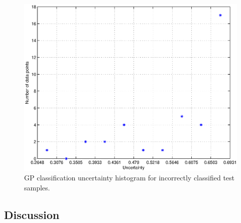 \documentclass[journal, a4paper]{IEEEtran}
\begin{document}
    \begin{figure}[ht]
      \centering
      \includegraphics[width=.8\linewidth]{covLINiso_likErf_infEP_false}
      \caption{GP classification uncertainty histogram for incorrectly classified test samples.}
      \label{fig:GP_false}
    \end{figure}    
  \subsection{Discussion}


% 
% 
\end{document}
